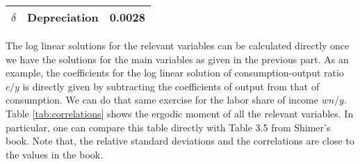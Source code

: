 \documentclass[11pt,letterpaper]{article}
\begin{document}
\begin{enumerate}
\begin{table}[htbp!]
\begin{tabular}{lrr}
  $\delta$ & Depreciation & 0.0028 \\
  \hline
\end{tabular}
\end{table}
The log linear solutions for the relevant variables can be calculated
directly once we have the solutions for the main variables as given in
the previous part. As an example, the coefficients for the log linear
solution of consumption-output ratio $c/y$ is directly given by
subtracting the coefficients of output from that of consumption. We
can do that same exercise for the labor share of income $wn/y$. \\
Table \ref{tab:correlations} shows the ergodic moment of all the
relevant variables. In particular, one can compare this table directly
with Table 3.5 from Shimer's book. Note that, the relative standard
deviations and the correlations are close to the values in the book.


\end{enumerate}
\end{document}
